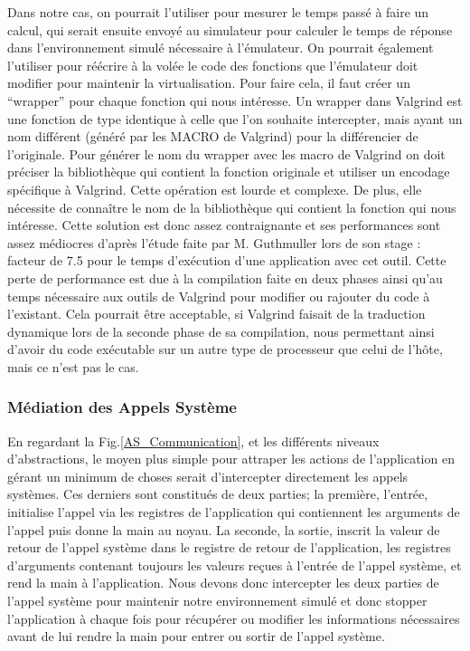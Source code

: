 Dans notre cas, on pourrait l'utiliser pour mesurer le temps passé à faire un calcul, qui serait ensuite envoyé au simulateur pour calculer le temps de réponse dans l'environnement simulé nécessaire à l'émulateur. On pourrait également l'utiliser pour réécrire à la volée le code des fonctions que l'émulateur doit modifier pour maintenir la virtualisation. Pour faire cela, il faut créer un ``wrapper'' pour chaque fonction qui nous intéresse. Un wrapper dans Valgrind est une fonction de type identique à celle que l'on souhaite intercepter, mais ayant un nom différent (généré par les MACRO de Valgrind) pour la différencier de l'originale. Pour générer le nom du wrapper avec les macro de Valgrind on doit préciser la bibliothèque qui contient la fonction originale et utiliser un encodage spécifique à Valgrind. Cette opération est lourde et complexe. De plus, elle nécessite de connaître le nom de la bibliothèque qui contient la fonction qui nous intéresse. Cette solution est donc assez contraignante et ses performances sont assez médiocres d'après l'étude faite par M. Guthmuller lors de son stage \cite{INTERCEPTION:MARION}: facteur de 7.5 pour le temps d'exécution d'une application avec cet outil. Cette perte de performance est due à la compilation faite en deux phases ainsi qu'au temps nécessaire aux outils de Valgrind pour modifier ou rajouter du code à l'existant. Cela pourrait être acceptable, si Valgrind faisait de la traduction dynamique lors de la seconde phase de sa compilation, nous permettant ainsi d'avoir du code exécutable sur un autre type de processeur que celui de l'hôte, mais ce n'est pas le cas. 

\subsubsection{Médiation des Appels Système}

En regardant la Fig.\ref{AS_Communication}, et les différents niveaux
d'abstractions, le moyen plus simple pour attraper les actions de l'application
en gérant un minimum de choses serait d'intercepter directement les appels
systèmes.  Ces derniers sont constitués de deux parties; la première, l'entrée,
initialise l'appel via les registres de l'application qui contiennent les
arguments de l'appel puis donne la main au noyau. La seconde, la sortie, inscrit
la valeur de retour de l'appel système dans le registre de retour de
l'application, les registres d'arguments contenant toujours les valeurs reçues à
l'entrée de l'appel système, et rend la main à l'application. Nous devons donc
intercepter les deux parties de l'appel système pour maintenir notre
environnement simulé et donc stopper l'application à chaque fois pour récupérer
ou modifier les informations nécessaires avant de lui rendre la main pour entrer
ou sortir de l'appel système.

